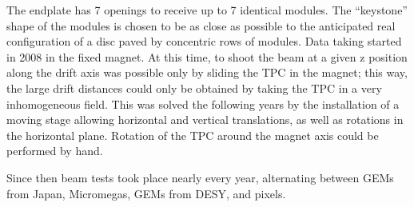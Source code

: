 The endplate has 7 openings to receive up to 7 identical modules. The ``keystone'' shape of the modules is chosen to be as close as possible to the anticipated real configuration of a disc paved by concentric rows of modules. Data taking started in 2008 in the fixed magnet. At this time, to shoot the beam at a given z position along the drift axis was possible only by sliding the TPC in the  magnet; this way, the large drift distances could only be obtained by taking the TPC in a very inhomogeneous field. This was solved the following years by the installation of a moving stage allowing horizontal and vertical translations, as well as rotations in the horizontal plane. Rotation of the TPC around the  magnet axis could be performed by hand.

Since then beam tests took place nearly every year, alternating between GEMs from Japan, Micromegas, GEMs from DESY, and pixels.




% 



